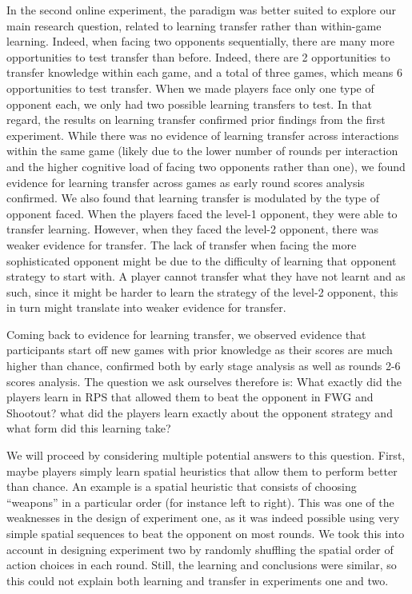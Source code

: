\documentclass[man,floatsintext]{apa6}
\begin{document}
In the second online experiment, the paradigm was better suited to explore our main research question, related to learning transfer rather than within-game learning. Indeed, when facing two opponents sequentially, there are many more opportunities to test transfer than before. Indeed, there are 2 opportunities to transfer knowledge within each game, and a total of three games, which means 6 opportunities to test transfer. When we made players face only one type of opponent each, we only had two possible learning transfers to test. In that regard, the results on learning transfer confirmed prior findings from the first experiment. While there was no evidence of learning transfer across interactions within the same game (likely due to the lower number of rounds per interaction and the higher cognitive load of facing two opponents rather than one), we found evidence for learning transfer across games as early round scores analysis confirmed. We also found that learning transfer is modulated by the type of opponent faced. When the players faced the level-1 opponent, they were able to transfer learning. However, when they faced the level-2 opponent, there was weaker evidence for transfer. The lack of transfer when facing the more sophisticated opponent might be due to the difficulty of learning that opponent strategy to start with. A player cannot transfer what they have not learnt and as such, since it might be harder to learn the strategy of the level-2 opponent, this in turn might translate into weaker evidence for transfer.

Coming back to evidence for learning transfer, we observed evidence that participants start off new games with prior knowledge as their scores are much higher than chance, confirmed both by early stage analysis as well as rounds 2-6 scores analysis. The question we ask ourselves therefore is: What exactly did the players learn in RPS that allowed them to beat the opponent in FWG and Shootout? what did the players learn exactly about the opponent strategy and what form did this learning take?

We will proceed by considering multiple potential answers to this question. First, maybe players simply learn spatial heuristics that allow them to perform better than chance. An example is a spatial heuristic that consists of choosing \enquote{weapons} in a particular order (for instance left to right). This was one of the weaknesses in the design of experiment one, as it was indeed possible using very simple spatial sequences to beat the opponent on most rounds. We took this into account in designing experiment two by randomly shuffling the spatial order of action choices in each round. Still, the learning and conclusions were similar, so this could not explain both learning and transfer in experiments one and two.
\end{document}
